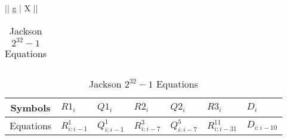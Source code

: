 \begin{table}[H]
\begin{tabularx}{\textwidth}{|| g | X ||}
    
    \end{tabularx}
    
    \begin{tabularx}{\textwidth}{X} 
    \\
    \end{tabularx}  
    
    
    \begin{tabularx}{\textwidth}{| c | X X X X X X | } 
        \hline%
        Symbols & $R1_i$ & $Q1_i$ & $R2_i$ & $Q2_i$ & $R3_i$ & $D_i$ \\
        \hline%
        Equations & $R^1_{i:i-1}$ & $Q^1_{i:i-1}$ & $R^3_{i:i-7}$ & $Q^5_{i:i-7}$ 
        & $R^{11}_{i:i-31}$ & $ D_{i:i-10}$ \\
        \hline
    \end{tabularx}
    
    
\caption{Jackson $2^{32}-1$ Equations}
\end{table}

